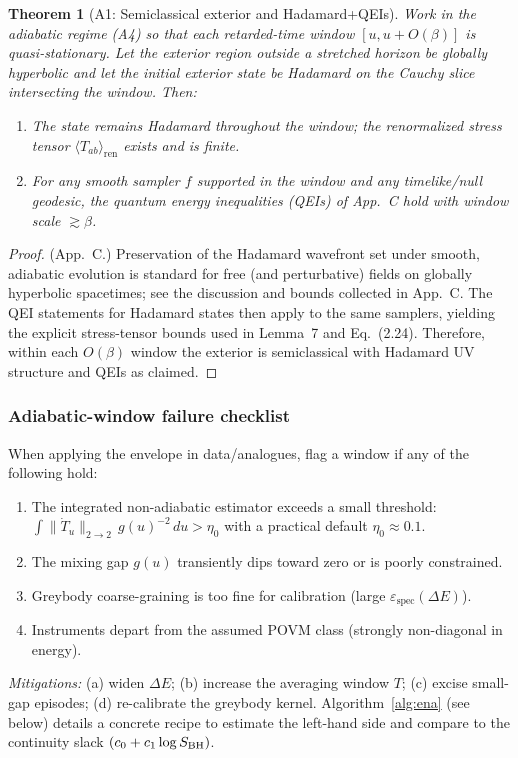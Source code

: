 \documentclass[11pt,a4paper]{article}
\theoremstyle{plain}
\newtheorem{theorem}{Theorem}
\theoremstyle{definition}
\theoremstyle{remark}
\begin{document}
\begin{theorem}[A1: Semiclassical exterior and Hadamard+QEIs]\label{thm:A1}
Work in the adiabatic regime (A4) so that each retarded-time window $[u,u+O(\beta)]$ is quasi-stationary. Let the exterior region outside a stretched horizon be globally hyperbolic and let the initial exterior state be Hadamard on the Cauchy slice intersecting the window. Then:
\begin{enumerate}
  \item The state remains Hadamard throughout the window; the renormalized stress tensor $\langle T_{ab}\rangle_{\mathrm{ren}}$ exists and is finite.
  \item For any smooth sampler $f$ supported in the window and any timelike/null geodesic, the quantum energy inequalities (QEIs) of App.~C hold with window scale $\gtrsim \beta$.
\end{enumerate}
\end{theorem}

\begin{proof}
(App.~C.) Preservation of the Hadamard wavefront set under smooth, adiabatic evolution is standard for free (and perturbative) fields on globally hyperbolic spacetimes; see the discussion and bounds collected in App.~C. The QEI statements for Hadamard states then apply to the same samplers, yielding the explicit stress-tensor bounds used in Lemma~7 and Eq.~(2.24). Therefore, within each $O(\beta)$ window the exterior is semiclassical with Hadamard UV structure and QEIs as claimed. 
\end{proof}

\subsubsection{Adiabatic-window failure checklist}
When applying the envelope in data/analogues, flag a window if any of the following hold:
\begin{enumerate}
  \item The integrated non-adiabatic estimator exceeds a small threshold:
        \(\displaystyle \int \|\dot T_u\|_{2\to 2}\, g(u)^{-2}\,du > \eta_0\)
        with a practical default \(\eta_0\approx 0.1\).
  \item The mixing gap \(g(u)\) transiently dips toward zero or is poorly constrained.
  \item Greybody coarse-graining is too fine for calibration (large \(\varepsilon_{\mathrm{spec}}(\Delta E)\)).
  \item Instruments depart from the assumed POVM class (strongly non-diago\-nal in energy).
\end{enumerate}
\emph{Mitigations:} (a) widen \(\Delta E\); (b) increase the averaging window \(T\);
(c) excise small-gap episodes; (d) re-calibrate the greybody kernel.
Algorithm~\ref{alg:ena} (see below) details a concrete recipe to
estimate the left-hand side and compare to the continuity slack \((c_0+c_1\log S_{\rm BH})\).
\end{document}
